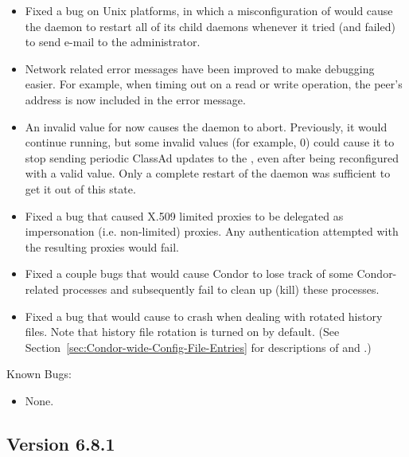 \begin{itemize}
\item Fixed a bug on Unix platforms, in which a misconfiguration of
 would cause the  daemon to restart
all of its child
daemons whenever it tried (and failed) to send e-mail to the
administrator.

\item Network related error messages have been improved to make debugging
easier.  For example, when timing out on a read or write operation, the
peer's address is now included in the error message.

\item An invalid value for  now causes
the  daemon to abort.  Previously, it would continue running,
but some invalid values (for example, 0) could cause it to stop sending
periodic ClassAd updates to the , even after being
reconfigured with a valid value.  Only a complete restart of
the  daemon was sufficient to get it out of this state.

\item Fixed a bug that caused X.509 limited proxies to be delegated as 
impersonation (i.e. non-limited) proxies. Any authentication attempted
with the resulting proxies would fail.

\item Fixed a couple bugs that would cause Condor to lose track of
some Condor-related processes and subsequently fail to clean up (kill)
these processes.

\item Fixed a bug that would cause  to crash when
dealing with rotated history files. Note that history file rotation is
turned on by default. (See
Section~\ref{sec:Condor-wide-Config-File-Entries} for descriptions of
 and
.)

\end{itemize}

\noindent Known Bugs:
\begin{itemize}

\item None.

\end{itemize}


\subsection*{\label{sec:New-6-8-1}Version 6.8.1}

